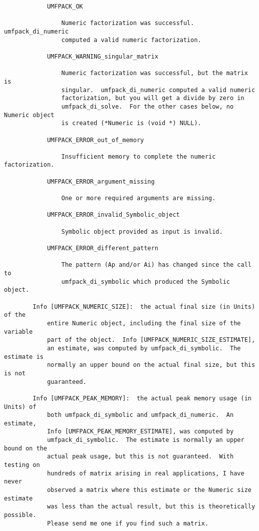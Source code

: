 \documentclass[11pt]{article}
\begin{document}
{\begin{verbatim}
            UMFPACK_OK

                Numeric factorization was successful.  umfpack_di_numeric
                computed a valid numeric factorization.

            UMFPACK_WARNING_singular_matrix

                Numeric factorization was successful, but the matrix is
                singular.  umfpack_di_numeric computed a valid numeric
                factorization, but you will get a divide by zero in
                umfpack_di_solve.  For the other cases below, no Numeric object
                is created (*Numeric is (void *) NULL).

            UMFPACK_ERROR_out_of_memory

                Insufficient memory to complete the numeric factorization.

            UMFPACK_ERROR_argument_missing

                One or more required arguments are missing.

            UMFPACK_ERROR_invalid_Symbolic_object

                Symbolic object provided as input is invalid.

            UMFPACK_ERROR_different_pattern

                The pattern (Ap and/or Ai) has changed since the call to
                umfpack_di_symbolic which produced the Symbolic object.

        Info [UMFPACK_NUMERIC_SIZE]:  the actual final size (in Units) of the
            entire Numeric object, including the final size of the variable
            part of the object.  Info [UMFPACK_NUMERIC_SIZE_ESTIMATE],
            an estimate, was computed by umfpack_di_symbolic.  The estimate is
            normally an upper bound on the actual final size, but this is not
            guaranteed.

        Info [UMFPACK_PEAK_MEMORY]:  the actual peak memory usage (in Units) of
            both umfpack_di_symbolic and umfpack_di_numeric.  An estimate,
            Info [UMFPACK_PEAK_MEMORY_ESTIMATE], was computed by
            umfpack_di_symbolic.  The estimate is normally an upper bound on the
            actual peak usage, but this is not guaranteed.  With testing on
            hundreds of matrix arising in real applications, I have never
            observed a matrix where this estimate or the Numeric size estimate
            was less than the actual result, but this is theoretically possible.
            Please send me one if you find such a matrix.


\end{verbatim}}
\end{document}
